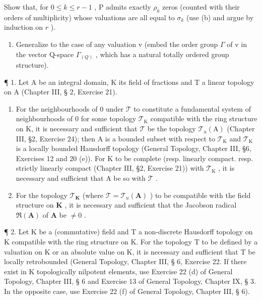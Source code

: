 Show that, for \(0 \leqslant k \leqslant r - 1\) , P admits exactly \(\rho_k\) zeros (counted with their orders of multiplicity) whose valuations are all equal to \(\sigma_k\) (use (b) and argue by induction on \(r\) ).

\begin{enumerate}
\def\labelenumi{(\alph{enumi})}
\setcounter{enumi}{3}
\tightlist
\item
  Generalize to the case of any valuation v (embed the order group \(\Gamma\) of v in the vector Q-space \(\Gamma_{(Q)}\) , which has a natural totally ordered group structure).
\end{enumerate}


¶ 1. Let A be an integral domain, K its field of fractions and T a linear topology on A (Chapter III, § 2, Exercise 21).

\begin{enumerate}
\def\labelenumi{(\alph{enumi})}
\item
  For the neighbourhoods of 0 under \(\mathcal{T}\) to constitute a fundamental system of neighbourhoods of 0 for some topology \(\mathcal{T}_{\mathrm{K}}\) compatible with the ring structure on K, it is necessary and sufficient that \(\mathcal{T}\) be the topology \(\mathcal{T}_{u}(\mathrm{A})\) (Chapter III, §2, Exercise 24); then A is a bounded subset with respect to \(\mathcal{T}_{\mathrm{K}}\) and \(\mathcal{T}_{\mathrm{K}}\) is a locally bounded Hausdorff topology (General Topology, Chapter III, §6, Exercises 12 and 20 (e)). For K to be complete (resp. linearly compact. resp. strictly linearly compact (Chapter III, §2, Exercise 21)) with \(\mathcal{T}_{\mathrm{K}}\) , it is necessary and sufficient that A be so with \(\mathcal{T}\) .
\item
  For the topology \(\mathcal{T}_{\mathbf{K}}\) (where \(\mathcal{T} = \mathcal{T}_u(\mathbf{A})\) ) to be compatible with the field structure on \(\mathbf{K}\) , it is necessary and sufficient that the Jacobson radical \(\Re(\mathbf{A})\) of \(\mathbf{A}\) be \(\neq 0\) .
\end{enumerate}

¶ 2. Let K be a (commutative) field and T a non-discrete Hausdorff topology on K compatible with the ring structure on K. For the topology T to be defined by a valuation on K or an absolute value on K, it is necessary and sufficient that T be locally retrobounded (General Topology, Chapter III, § 6, Exercise 22. If there exist in K topologically nilpotent elements, use Exercise 22 (d) of General Topology, Chapter III, § 6 and Exercise 13 of General Topology, Chapter IX, § 3. In the opposite case, use Exercise 22 (f) of General Topology, Chapter III, § 6).

